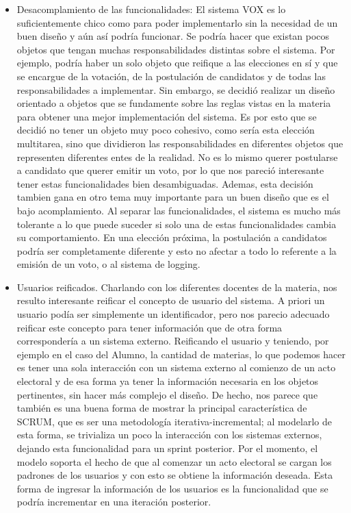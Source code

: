 \begin{itemize}
\item Desacomplamiento de las funcionalidades: El sistema VOX es lo suficientemente chico como para poder implementarlo sin la necesidad de un buen diseño y a\'un as\'i podr\'ia funcionar. Se podr\'ia hacer que existan pocos objetos que tengan muchas responsabilidades distintas sobre el sistema. Por ejemplo, podr\'ia haber un solo objeto que reifique a las elecciones en s\'i y que se encargue de la votaci\'on, de la postulaci\'on de candidatos y de todas las responsabilidades a implementar. Sin embargo, se decidi\'o realizar un dise\~{n}o orientado a objetos que se fundamente sobre las reglas vistas en la materia para obtener una mejor implementaci\'on del sistema. Es por esto que se decidi\'o no tener un objeto muy poco cohesivo, como ser\'ia esta elecci\'on multitarea, sino que dividieron las responsabilidades en diferentes objetos que representen diferentes entes de la realidad. No es lo mismo querer postularse a candidato que querer emitir un voto, por lo que nos pareci\'o interesante tener estas funcionalidades bien desambiguadas. Ademas, esta decisi\'on tambien gana en otro tema muy importante para un buen diseño que es el bajo acomplamiento. Al separar las funcionalidades, el sistema es mucho m\'as tolerante a lo que puede suceder si solo una de estas funcionalidades cambia su comportamiento. En una elecci\'on pr\'oxima, la postulaci\'on a candidatos podr\'ia ser completamente diferente y esto no afectar a todo lo referente a la emisi\'on de un voto, o al sistema de logging.

\item Usuarios reificados. Charlando con los diferentes docentes de la materia, nos resulto interesante reificar el concepto de usuario del sistema. A priori un usuario pod\'ia ser simplemente un identificador, pero nos parecio adecuado reificar este concepto para tener informaci\'on que de otra forma corresponder\'ia a un sistema externo. Reificando el usuario y teniendo, por ejemplo en el caso del Alumno, la cantidad de materias, lo que podemos hacer es tener una sola interacci\'on con un sistema externo al comienzo de un acto electoral y de esa forma ya tener la informaci\'on necesaria en los objetos pertinentes, sin hacer m\'as complejo el dise\~{n}o. De hecho, nos parece que tambi\'en es una buena forma de mostrar la principal caracter\'istica de SCRUM, que es ser una metodolog\'ia iterativa-incremental; al modelarlo de esta forma, se trivializa un poco la interacci\'on con los sistemas externos, dejando esta funcionalidad para un sprint posterior. Por el momento, el modelo soporta el hecho de que al comenzar un acto electoral se cargan los padrones de los usuarios y con esto se obtiene la informaci\'on deseada. Esta forma de ingresar la informaci\'on de los usuarios es la funcionalidad que se podr\'ia incrementar en una iteraci\'on posterior.




\end{itemize}
